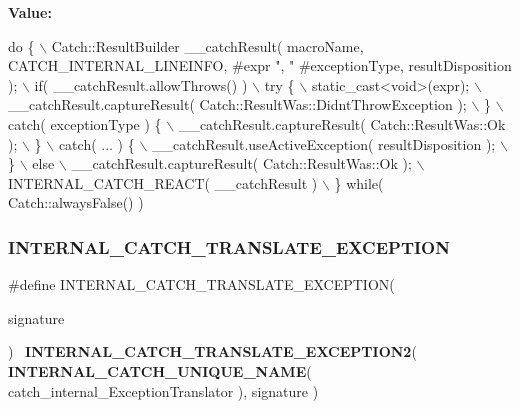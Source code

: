 {\bfseries Value\+:}
\begin{DoxyCode}
\textcolor{keywordflow}{do} \{ \(\backslash\)
        Catch::ResultBuilder \_\_catchResult( macroName, CATCH_INTERNAL_LINEINFO, #expr \textcolor{stringliteral}{", "} #exceptionType, 
      resultDisposition ); \(\backslash\)
        if( \_\_catchResult.allowThrows() ) \(\backslash\)
            \textcolor{keywordflow}{try} \{ \(\backslash\)
                static\_cast<\textcolor{keywordtype}{void}>(expr); \(\backslash\)
                \_\_catchResult.captureResult( 
      Catch::ResultWas::DidntThrowException ); \(\backslash\)
            \} \(\backslash\)
            catch( exceptionType ) \{ \(\backslash\)
                \_\_catchResult.captureResult( Catch::ResultWas::Ok ); \(\backslash\)
            \} \(\backslash\)
            catch( ... ) \{ \(\backslash\)
                \_\_catchResult.useActiveException( resultDisposition ); \(\backslash\)
            \} \(\backslash\)
        else \(\backslash\)
            \_\_catchResult.captureResult( Catch::ResultWas::Ok ); \(\backslash\)
        INTERNAL\_CATCH\_REACT( \_\_catchResult ) \(\backslash\)
    \} \textcolor{keywordflow}{while}( Catch::alwaysFalse() )
\end{DoxyCode}
\mbox{\label{catch_8hpp_a109d814750b0a695e2b66e9c53e748c0}} 
\subsubsection{I\+N\+T\+E\+R\+N\+A\+L\+\_\+\+C\+A\+T\+C\+H\+\_\+\+T\+R\+A\+N\+S\+L\+A\+T\+E\+\_\+\+E\+X\+C\+E\+P\+T\+I\+ON}
{\footnotesize\ttfamily \#define I\+N\+T\+E\+R\+N\+A\+L\+\_\+\+C\+A\+T\+C\+H\+\_\+\+T\+R\+A\+N\+S\+L\+A\+T\+E\+\_\+\+E\+X\+C\+E\+P\+T\+I\+ON(\begin{DoxyParamCaption}\item[{}]{signature }\end{DoxyParamCaption})~\textbf{ I\+N\+T\+E\+R\+N\+A\+L\+\_\+\+C\+A\+T\+C\+H\+\_\+\+T\+R\+A\+N\+S\+L\+A\+T\+E\+\_\+\+E\+X\+C\+E\+P\+T\+I\+O\+N2}( \textbf{ I\+N\+T\+E\+R\+N\+A\+L\+\_\+\+C\+A\+T\+C\+H\+\_\+\+U\+N\+I\+Q\+U\+E\+\_\+\+N\+A\+ME}( catch\+\_\+internal\+\_\+\+Exception\+Translator ), signature )}

